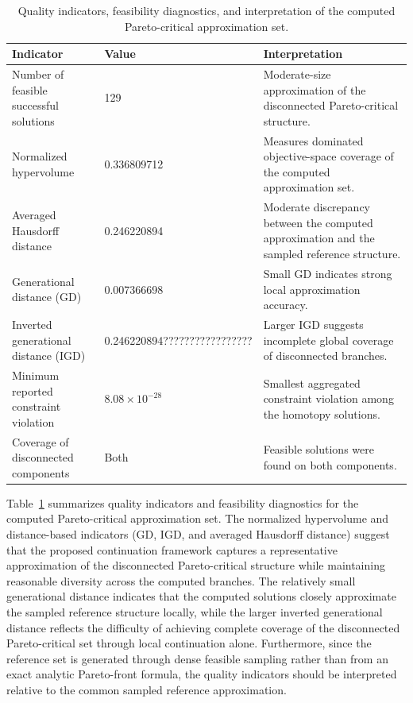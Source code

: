 \documentclass[11pt,pdflatex,sn-mathphys-ay]{sn-jnl}%
\theoremstyle{definition}
\theoremstyle{thmstyleone}%
\theoremstyle{thmstyletwo}%
\theoremstyle{thmstylethree}%
\begin{document}
	\begin{table}[h]
		\centering
		\caption{Quality indicators, feasibility diagnostics, and interpretation of the computed Pareto-critical approximation set.}
		\label{tab:quality_indicators_manyobj}
		\renewcommand{\arraystretch}{1.15}
		\begin{tabular}{p{5.2cm} p{2.2cm} p{5.5cm}}
			\toprule
			\textbf{Indicator} & \textbf{Value} & \textbf{Interpretation} \\
			\midrule
			Number of feasible successful solutions 
			& 129 
			& Moderate-size approximation of the disconnected Pareto-critical structure. \\\hline
			Normalized hypervolume 
			& 0.336809712
			& Measures dominated objective-space coverage of the computed approximation set. \\\hline
			Averaged Hausdorff distance 
			& 0.246220894 
			& Moderate discrepancy between the computed approximation and the sampled reference structure. \\\hline
			Generational distance (GD) 
			& 0.007366698 
			& Small GD indicates strong local approximation accuracy. \\\hline
			Inverted generational distance (IGD) 
			& 0.246220894?????????????????
			& Larger IGD suggests incomplete global coverage of disconnected branches. \\\hline
			Minimum reported constraint violation
			& $8.08\times10^{-28}$
			& Smallest aggregated constraint violation among the homotopy solutions. \\\hline
			Coverage of disconnected components
			& Both
			& Feasible solutions were found on both components. \\
			\bottomrule
		\end{tabular}
	\end{table}
	
	Table~\ref{tab:quality_indicators_manyobj} summarizes quality indicators and feasibility diagnostics for the computed Pareto-critical approximation set. The normalized hypervolume and distance-based indicators (GD, IGD, and averaged Hausdorff distance) suggest that the proposed continuation framework captures a representative approximation of the disconnected Pareto-critical structure while maintaining reasonable diversity across the computed branches. The relatively small generational distance indicates that the computed solutions closely approximate the sampled reference structure locally, while the larger inverted generational distance reflects the difficulty of achieving complete coverage of the disconnected Pareto-critical set through local continuation alone. Furthermore, since the reference set is generated through dense feasible sampling rather than from an exact analytic Pareto-front formula, the quality indicators should be interpreted relative to the common sampled reference approximation.
	
\end{document}
